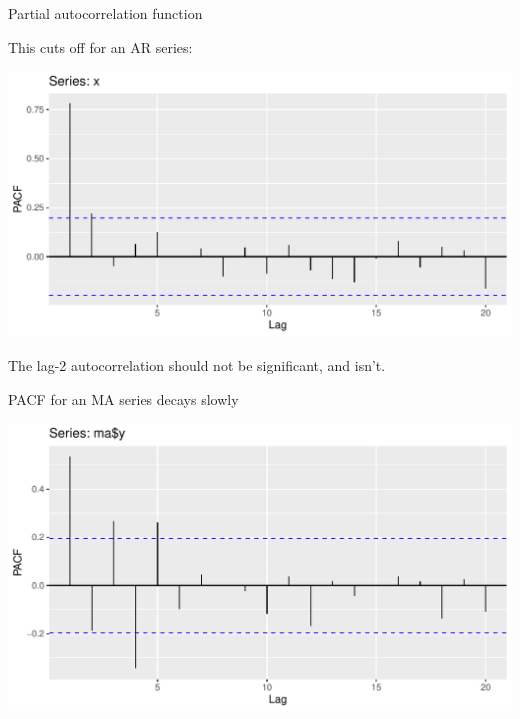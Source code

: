 \documentclass[ignorenonframetext,]{beamer}
\newenvironment{Shaded}{\begin{snugshade}}{\end{snugshade}}
\newcommand{\DataTypeTok}[1]{\textcolor[rgb]{0.13,0.29,0.53}{#1}}
\newcommand{\KeywordTok}[1]{\textcolor[rgb]{0.13,0.29,0.53}{\textbf{#1}}}
\newcommand{\NormalTok}[1]{#1}
\newcommand{\OperatorTok}[1]{\textcolor[rgb]{0.81,0.36,0.00}{\textbf{#1}}}
\newcommand{\StringTok}[1]{\textcolor[rgb]{0.31,0.60,0.02}{#1}}
\begin{document}
\begin{frame}[fragile]{Partial autocorrelation function}
\protect\hypertarget{partial-autocorrelation-function}{}

This cuts off for an AR series:

\begin{Shaded}
\end{Shaded}

\includegraphics{figure/unnamed-chunk-605-1.pdf}

The lag-2 autocorrelation should not be significant, and isn't.

\end{frame}

\begin{frame}[fragile]{PACF for an MA series decays slowly}
\protect\hypertarget{pacf-for-an-ma-series-decays-slowly}{}

\begin{Shaded}
\end{Shaded}

\includegraphics{figure/unnamed-chunk-606-1.pdf}

\end{frame}
\end{document}
